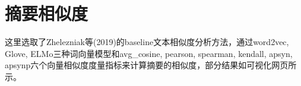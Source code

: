 \documentclass{bmvc2k}
\begin{document}
\section{摘要相似度}
这里选取了Zhelezniak等(2019)\cite{2019arXiv190507790Z}的baseline文本相似度分析方法，通过word2vec, Glove, ELMo三种词向量模型和avg\_cosine, pearson, spearman,
kendall, apsyn, apsynp六个向量相似度度量指标来计算摘要的相似度，部分结果如可视化网页所示。
\end{document}
